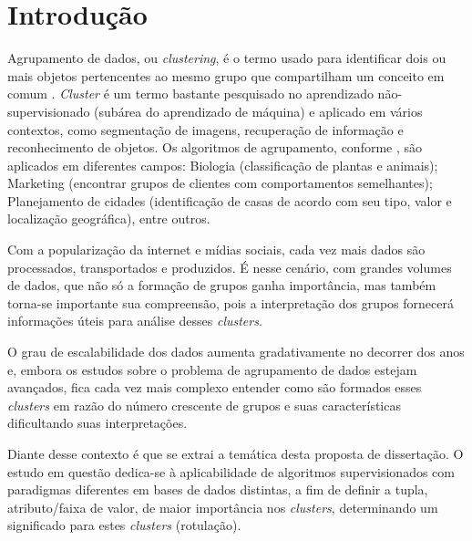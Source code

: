 

\chapter{Introdução} \label{cap:introd}

Agrupamento de dados, ou \textit{clustering}, é o termo usado para identificar dois ou  mais objetos pertencentes ao mesmo grupo que compartilham um conceito em comum    \cite{Kumar2013}. \textit{Cluster} é um termo bastante pesquisado no aprendizado não-supervisionado (subárea do aprendizado de máquina) e aplicado em vários contextos, como segmentação de imagens, recuperação de informação e reconhecimento de objetos. Os algoritmos de agrupamento, conforme , são aplicados em diferentes campos: Biologia (classificação de plantas e animais); Marketing (encontrar grupos de clientes com comportamentos semelhantes); Planejamento de cidades (identificação de casas de acordo com seu tipo, valor e localização geográfica), entre outros. 


Com a popularização da internet e mídias sociais, cada vez mais dados são processados, transportados e produzidos. É nesse cenário, com grandes volumes de dados, que não só a formação de grupos ganha importância, mas também torna-se importante sua compreensão, pois a interpretação dos grupos fornecerá informações úteis para análise desses \textit{clusters}. 

O grau de escalabilidade dos dados aumenta gradativamente no decorrer dos anos e, embora os estudos sobre o problema de agrupamento de dados estejam avançados, fica cada vez mais complexo entender como são formados esses \textit{clusters} em razão do número crescente de grupos e suas características dificultando suas interpretações. 

Diante desse contexto é que se extrai a temática desta proposta de dissertação. O estudo em questão dedica-se à aplicabilidade de algoritmos supervisionados com paradigmas diferentes em bases de dados distintas, a fim de definir a tupla, atributo/faixa de valor, de maior importância nos \textit{clusters}, determinando um significado para estes \textit{clusters} (rotulação). 


